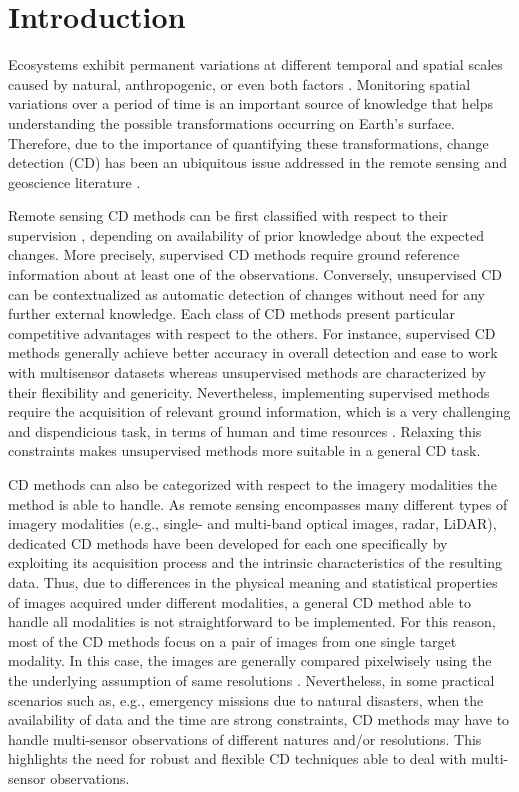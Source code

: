 \documentclass[review]{elsarticle}
\begin{document}

\section{Introduction}

Ecosystems exhibit permanent variations at different temporal and spatial scales caused by natural, anthropogenic, or even both factors \citep{coppin_review_2004}. Monitoring spatial variations over a period of time is an important source of knowledge that helps understanding the possible transformations occurring on Earth's surface. Therefore, due to the importance of quantifying these transformations, change detection (CD) has been an ubiquitous issue addressed in the remote sensing and geoscience literature \citep{lu_change_2004}.

Remote sensing CD methods can be first classified with respect to their supervision \citep{bovolo_theoretical_2007}, depending on availability of prior knowledge about the expected changes. More precisely, supervised CD methods require ground reference information about at least one of the observations. Conversely, unsupervised CD can be contextualized as automatic detection of changes without need for any further external knowledge. Each class of CD methods present particular competitive advantages with respect to the others. For instance, supervised CD methods generally achieve better accuracy in overall detection and ease to work with multisensor datasets whereas unsupervised methods are characterized by their flexibility and genericity. Nevertheless, implementing supervised methods require the acquisition of relevant ground information, which is a very challenging and dispendicious task, in terms of human and time resources \citep{bovolo_theoretical_2007}. Relaxing this constraints makes unsupervised methods more suitable in a general CD task.

CD methods can also be categorized with respect to the imagery modalities the method is able to handle. As remote sensing encompasses many different types of imagery modalities (e.g., single- and multi-band optical images, radar, LiDAR), dedicated CD methods have been developed for each one specifically by exploiting its acquisition process and the intrinsic characteristics of the resulting data. Thus, due to differences in the physical meaning and statistical properties of images acquired under different modalities, a general CD method able to handle all modalities is not straightforward to be implemented. For this reason, most of the CD methods focus on a pair of images from one single target modality. In this case, the images are generally compared pixelwisely using the the underlying assumption of same resolutions \citep{singh_review_1989,bovolo_time_2015}. Nevertheless, in some practical scenarios such as, e.g., emergency missions due to natural disasters, when the availability of data and the time are strong constraints, CD methods may have to handle multi-sensor observations of different natures and/or resolutions. This highlights the need for robust and flexible CD techniques able to deal with multi-sensor observations.
\end{document}
